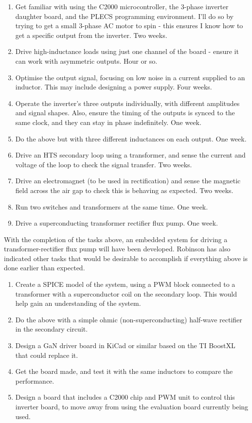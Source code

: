 \documentclass[11pt, a4paper, twoside, openright]{article}
\begin{document}
\begin{enumerate}
	\item Get familiar with using the C2000 microcontroller, the 3-phase inverter daughter board, and the PLECS programming environment. I'll do so by trying to get a small 3-phase AC motor to spin - this ensures I know how to get a specific output from the inverter. Two weeks.
	\item Drive high-inductance loads using just one channel of the board - ensure it can work with asymmetric outputs. Hour or so.
	\item Optimise the output signal, focusing on low noise in a current supplied to an inductor. This may include designing a power supply. Four weeks.
	\item Operate the inverter's three outputs individually, with different amplitudes and signal shapes. Also, ensure the timing of the outputs is synced to the same clock, and they can stay in phase indefinitely. One week.
	\item Do the above but with three different inductances on each output. One week.
	\item Drive an HTS secondary loop using a transformer, and sense the current and voltage of the loop to check the signal transfer. Two weeks.
	\item Drive an electromagnet (to be used in rectification) and sense the magnetic field across the air gap to check this is behaving as expected. Two weeks.
	\item Run two switches and transformers at the same time. One week.
	\item Drive a superconducting transformer rectifier flux pump. One week.
\end{enumerate}
With the completion of the tasks above, an embedded system for driving a transformer-rectifier flux pump will have been developed. Robinson has also indicated other tasks that would be desirable to accomplish if everything above is done earlier than expected.
\begin{enumerate}
	\item Create a SPICE model of the system, using a PWM block connected to a transformer with a superconductor coil on the secondary loop. This would help gain an understanding of the system.
	\item Do the above with a simple ohmic (non-superconducting) half-wave rectifier in the secondary circuit.
	\item Design a GaN driver board in KiCad or similar based on the TI BoostXL that could replace it.
	\item Get the board made, and test it with the same inductors to compare the performance.
	\item Design a board that includes a C2000 chip and PWM unit to control this inverter board, to move away from using the evaluation board currently being used.
\end{enumerate}
\end{document}
